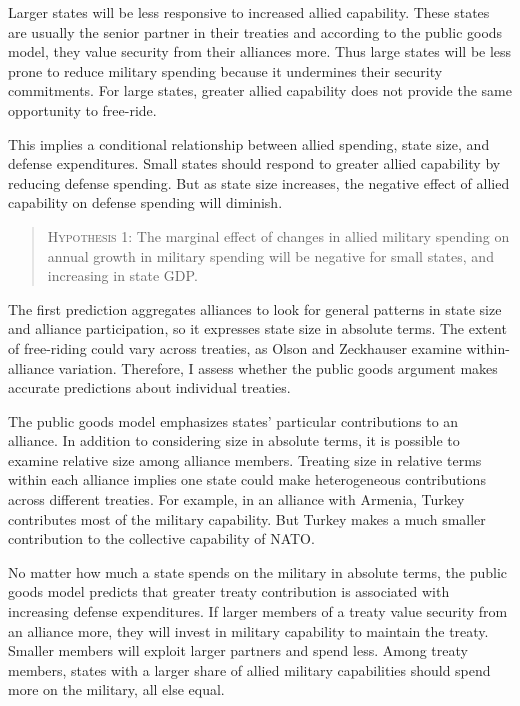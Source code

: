 \documentclass[12pt]{article}
\begin{document}
 
Larger states will be less responsive to increased allied capability. 
These states are usually the senior partner in their treaties and according to the public goods model, they value security from their alliances more. 
Thus large states will be less prone to reduce military spending because it undermines their security commitments. 
For large states, greater allied capability does not provide the same opportunity to free-ride.


This implies a conditional relationship between allied spending, state size, and defense expenditures. 
Small states should respond to greater allied capability by reducing defense spending. 
But as state size increases, the negative effect of allied capability on defense spending will diminish. 


\begin{quote}
\textsc{Hypothesis 1}: The marginal effect of changes in allied military spending on annual growth in military spending will be negative for small states, and increasing in state GDP. 
\end{quote}


The first prediction aggregates alliances to look for general patterns in state size and alliance participation, so it expresses state size in absolute terms. 
The extent of free-riding could vary across treaties, as Olson and Zeckhauser examine within-alliance variation.
Therefore, I assess whether the public goods argument makes accurate predictions about individual treaties. 

 
The public goods model emphasizes states' particular contributions to an alliance.
In addition to considering size in absolute terms, it is possible to examine relative size among alliance members.  
Treating size in relative terms within each alliance implies one state could make heterogeneous contributions across different treaties. 
For example, in an alliance with Armenia, Turkey contributes most of the military capability.  
But Turkey makes a much smaller contribution to the collective capability of NATO. 


No matter how much a state spends on the military in absolute terms, the public goods model predicts that greater treaty contribution is associated with increasing defense expenditures. 
If larger members of a treaty value security from an alliance more, they will invest in military capability to maintain the treaty.
Smaller members will exploit larger partners and spend less. 
Among treaty members, states with a larger share of allied military capabilities should spend more on the military, all else equal. 
\end{document}
